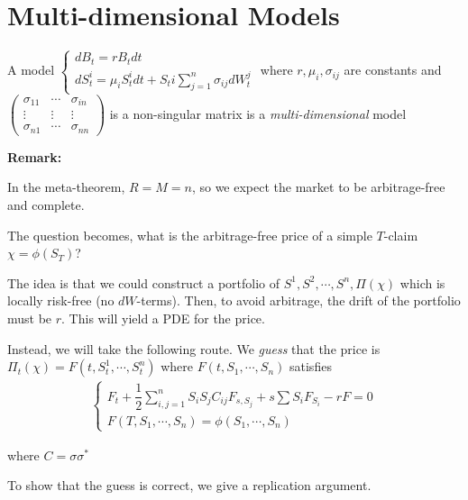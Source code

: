 \section{Multi-dimensional Models}
\begin{defo}{}
  A model $\begin{cases}
    dB_t = rB_tdt\\ dS_t^i = \mu_iS_t^idt+S_ti\sum_{j=1}^{n}\sigma_{ij}dW_t^j
    \end{cases}$ where $r,\mu_i,\sigma_{ij}$ are constants and $\begin{pmatrix}\sigma_{11}&\cdots&\sigma_{in}\\\vdots&\vdots&\vdots\\\sigma_{n1}&\cdots&\sigma_{nn}\end{pmatrix}$ is a non-singular matrix is a \textit{multi-dimensional }model
\end{defo}
\par\bigskip
\noindent\textbf{Remark:}\par
\noindent In the meta-theorem, $R=M=n$, so we expect the market to be arbitrage-free and complete.
\par\bigskip
\noindent The question becomes, what is the arbitrage-free price of a simple $T$-claim $\chi = \phi(S_T)$?
\par\bigskip
\noindent The idea is that we could construct a portfolio of $S^1,S^2,\cdots,S^n,\Pi(\chi)$ which is locally risk-free (no $dW$-terms). Then, to avoid arbitrage, the drift of the portfolio must be $r$. This will yield a PDE for the price.
\par\bigskip
\noindent Instead, we will take the following route. We \textit{guess} that the price is $\Pi_t(\chi) = F(t,S_t^1,\cdots,S_t^n)$ where $F(t,S_1,\cdots,S_n)$ satisfies
\begin{equation}
  \begin{gathered}
    \begin{cases}
      F_t+\dfrac{1}{2}\sum_{i,j=1}^{n}S_iS_jC_{ij}F_{s,S_j}+s\sum S_iF_{S_i}-rF=0\\
      F(T,S_1,\cdots,S_n) = \phi(S_1,\cdots,S_n)
    \end{cases}
  \end{gathered}
\end{equation}\par
\noindent where $C=\sigma\sigma^*$\par
\noindent To show that the guess is correct, we give a replication argument.
\par\bigskip

